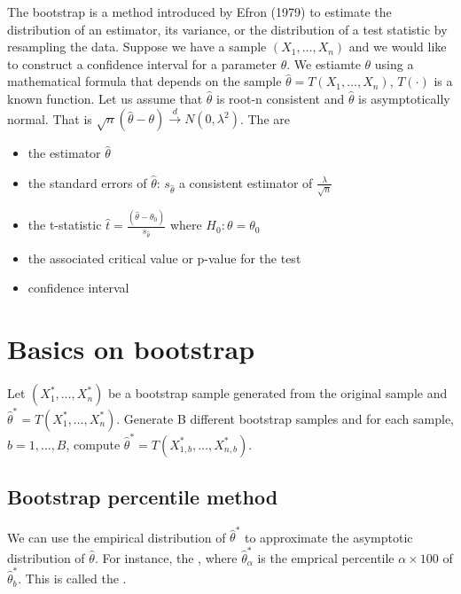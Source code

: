 \ChapterHeading

The bootstrap is a method introduced by Efron (1979) to estimate the distribution of an estimator, its variance, or the distribution of a test statistic by resampling the data.
Suppose we have a sample $(X_1,\ldots,X_n)$ and we would like to construct a confidence interval for a parameter $\theta$.
We estiamte $\theta$ using a mathematical formula that depends on the sample $\hat{\theta} = T(X_1,\ldots,X_n)$, $T(\cdot)$ is a known function.
Let us assume that $\hat{\theta}$ is root-n consistent and $\hat{\theta}$ is asymptotically normal. That is $\sqrt{n}(\hat{\theta}-\theta)\xrightarrow{d}N(0,\lambda^2)$.
The  are 
\begin{itemize}
    \item the estimator $\hat{\theta}$
    \item the standard errors of $\hat{\theta}$: $s_{\hat{\theta}}$ a consistent estimator of $\frac{\lambda}{\sqrt{n}}$
    \item the t-statistic $\hat{t} = \frac{(\hat{\theta}-\theta_{0})}{s_{\hat{\theta}}}$ where $H_0 : \theta = \theta_0$
    \item the associated critical value or p-value for the test
    \item confidence interval
\end{itemize}

\section{Basics on bootstrap}

Let $(X_1^*,\ldots,X_n^*)$ be a bootstrap sample generated from the original sample and $\hat{\theta}^* = T(X_1^*,\ldots,X_n^*)$.
Generate B different bootstrap samples and for each sample, $b=1,\ldots,B$, compute $\hat{\theta}^*=T(X_{1,b}^*,\ldots,X_{n,b}^*)$.

\subsection{Bootstrap percentile method}
We can use the empirical distribution of $\hat{\theta}^*$ to approximate the asymptotic distribution of $\hat{\theta}$.
For instance, the ,
where $\hat{\theta}^*_{\alpha}$ is the emprical percentile $\alpha\times 100$ of $\hat{\theta}^*_b$. This is called the .\\

